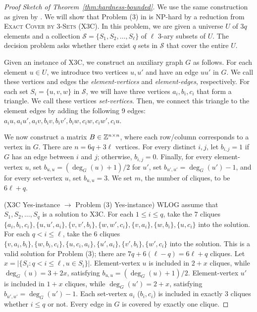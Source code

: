 \begin{proof}[Proof Sketch of Theorem~\ref{thm:hardness-bounded}]
  We use the same construction as given by \cite{cooley_parameterized_2021,shaohan1988complexity}.
  We will show that Problem (3) in  is NP-hard by a reduction from 
  \textsc{Exact Cover by 3-Sets (X3C)}.
  In this problem, we are given a universe $U$ of $3q$ elements and a collection
  $\mathcal{S}=\{S_1,S_2,\ldots,S_\ell\}$ of $\ell$ 3-ary subsets of $U$.
  The decision problem asks whether there exist $q$ sets in $\mathcal{S}$ that cover the entire $U$.

  Given an instance of X3C, we construct an auxiliary graph $G$ as follows.
  For each element $u\in U$, we introduce two vertices $u, u'$ and have an edge $uu'$ in $G$.
  We call these vertices and edges the \textit{element-vertices} and \textit{element-edges}, respectively.
  For each set $S_i=\{u,v,w\}$ in $\mathcal{S}$, we will have three vertices $a_i, b_i, c_i$ that
  form a triangle. We call these vertices \textit{set-vertices}.
  Then, we connect this triangle to the element edges by adding the following 9 edges:
  $a_i u, a_i u', a_i v, b_i v, b_i v', b_i w, c_i w, c_i w', c_i u$.

  We now construct a matrix $B \in \mathbb{Z}^{n \times n}$, where each row/column corresponds to 
  a vertex in $G$. There are $n = 6q + 3\ell$ vertices.
  For every distinct $i, j$, let $b_{i,j} = 1$ if $G$ has an edge between $i$ and $j$;
  otherwise, $b_{i,j}=0$.
  Finally, for every element-vertex $u$, set $b_{u,u}=(\deg_G(u) + 1)/2$
  for $u'$, set $b_{u',u'}=\deg_G(u')-1$, and 
  for every set-vertex $u$, set $b_{u,u}=3$.
  We set $m$, the number of cliques, to be $6\ell + q$.

  (X3C Yes-instance $\to$ Problem (3) Yes-instance)
  WLOG assume that $S_1,S_2,\ldots,S_q$ is a solution to X3C.
  For each $1 \leq i \leq q$, take the 7 cliques
  $\{a_i, b_i, c_i\}, \{u, u', a_i\}, \{v, v', b_i\}, \{w, w', c_i\}, \{v, a_i\}, \{w, b_i\}, \{u, c_i\}$
  into the solution.
  For each $q < i \leq \ell$, take the 6 cliques
  $\{v, a_i, b_i\}, \{w, b_i, c_i\}, \{u, c_i, a_i\}, \{u', a_i\}, \{v', b_i\}, \{w', c_i\}$
  into the solution.
  This is a valid solution for Problem (3);
  there are $7q + 6(\ell - q) = 6\ell + q$ cliques.
  Let $x=|\{S_i: q < i \leq \ell, u \in S_i \}|$.
  Element-vertex $u$ is included in $2 + x$ cliques,
  while $\deg_G(u)=3+2x$, satisfying $b_{u,u}=(\deg_G(u)+1)/2$.
  Element-vertex $u'$ is included in $1 + x$ cliques,
  while $\deg_G(u')=2+x$, satisfying $b_{u',u'}=\deg_G(u')-1$.
  Each set-vertex $a_i$ ($b_i, c_i$) is included in exactly 3 cliques whether $i \leq q$ or not.
  Every edge in $G$ is covered by exactly one clique.


\end{proof}
